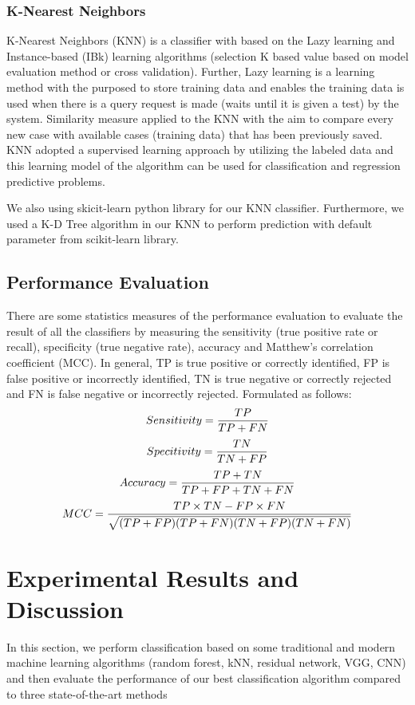 \documentclass[12pt]{article}
\begin{document}
\subsubsection{K-Nearest Neighbors}
K-Nearest Neighbors (KNN) is a classifier with based on the Lazy learning and Instance-based (IBk) learning algorithms (selection K based value based on model evaluation method or cross validation). Further, Lazy learning is a learning method with the purposed to store training data and enables the training data is used when there is a query request is made (waits until it is given a test) by the system. Similarity measure applied to the KNN with the aim to compare every new case with available cases (training data) that has been previously saved. KNN adopted a supervised learning approach by utilizing the labeled data and this learning model of the algorithm can be used for classification and regression predictive problems.
\par
We also using skicit-learn python library for our KNN classifier. Furthermore, we used a K-D Tree algorithm in our KNN to perform prediction with default parameter from scikit-learn library.
\subsection{Performance Evaluation}
There are some statistics measures of the performance evaluation to evaluate the result of all the classifiers by measuring the sensitivity (true positive rate or recall), specificity (true negative rate), accuracy and Matthew's correlation coefficient (MCC). In general, TP is true positive or correctly identified, FP is false positive or incorrectly identified, TN is true negative or correctly rejected and FN is false negative or incorrectly rejected. Formulated as follows:
\begin{equation}
\small
Sensitivity=\frac{TP}{TP+FN}
\end{equation}
\begin{equation}
\small
Specitivity=\frac{TN}{TN+FP}
\end{equation}
\begin{equation}
\small
Accuracy=\frac{TP+TN}{TP+FP+TN+FN}
\end{equation}
\begin{equation}
\small
MCC=\frac{TP\times TN-FP \times FN}{\sqrt{(TP+FP)(TP+FN)(TN+FP)(TN+FN)}}
\end{equation}
\section{Experimental Results and Discussion}
In this section, we perform classification based on some traditional and modern machine learning algorithms (random forest, kNN, residual network, VGG, CNN) and then evaluate  the  performance  of  our best classification algorithm compared to three state-of-the-art  methods \cite{khaidem2016predicting,patel2015predicting,zhang2018improving}
\end{document}
